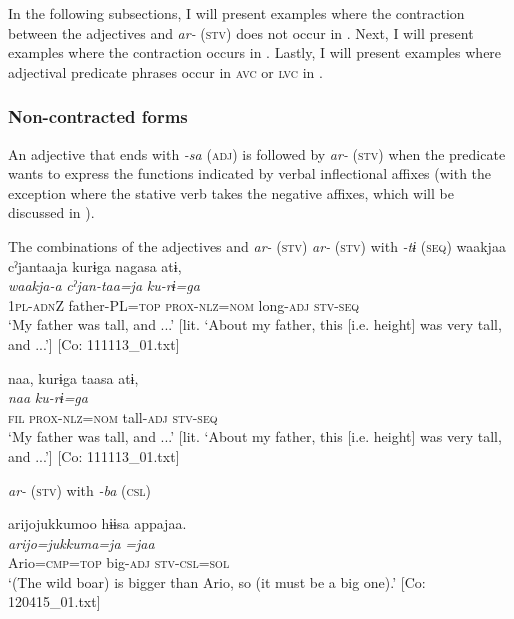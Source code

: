   In the following subsections, I will present examples where the contraction between the adjectives and \textit{ar-} (\textsc{stv}) does not occur in . Next, I will present examples where the contraction occurs in . Lastly, I will present examples where adjectival predicate phrases occur in \textsc{avc} or \textsc{lvc} in .

\subsubsection{Non-contracted forms}\label{sec:9.2.2.1}
\label{bkm:Ref361739107}
An adjective that ends with \textit{{}-sa} (\textsc{adj}) is followed by \textit{ar-} (\textsc{stv}) when the predicate wants to express the functions indicated by verbal inflectional affixes (with the exception where the stative verb takes the negative affixes, which will be discussed in ).

\ea   The combinations of the adjectives and \textit{ar-} (\textsc{stv}) \label{ex:9.45}
\exi{}  \textit{ar-} (\textsc{stv}) with \textit{{}-tɨ} (\textsc{seq})
\ea %
 \glll  waakjaa  cˀjantaaja  kurɨga  nagasa  atɨ,\\
      \textit{waakja-a}  \textit{cˀjan-taa=ja}  \textit{ku-rɨ=ga}  \textit{}  \textit{}\\
      1\textsc{pl}-\textsc{adn}Z  father-PL=\textsc{top}  \textsc{prox}-\textsc{nlz}=\textsc{nom}  long-\textsc{adj}  \textsc{stv}-\textsc{seq}\\
      \glt       ‘My father was tall, and ...’ [lit. ‘About my father, this [i.e. height] was very tall, and ...’] [Co: 111113\_01.txt]

\ex \label{ex:9.45b} %
    \glll  naa,  kurɨga  taasa  atɨ,\\
      \textit{naa}  \textit{ku-rɨ=ga}  \textit{}  \textit{}\\
      \textsc{fil}  \textsc{prox}-\textsc{nlz}=\textsc{nom}  tall-\textsc{adj}  \textsc{stv}-\textsc{seq}\\
      \glt       ‘My father was tall, and ...’ [lit. ‘About my father, this [i.e. height] was very tall, and ...’] [Co: 111113\_01.txt]

\exi{} \textit{ar-} (\textsc{stv}) with \textit{{}-ba} (\textsc{csl})

\ex \label{ex:9.45c} %
    \glll  arijojukkumoo  hɨɨsa  appajaa.\\
      \textit{arijo=jukkuma=ja}  \textit{}  \textit{=jaa}\\
      Ario=\textsc{cmp}=\textsc{top}  big-\textsc{adj}  \textsc{stv}-\textsc{csl}=\textsc{sol}\\
      \glt       ‘(The wild boar) is bigger than Ario, so (it must be a big one).’ [Co: 120415\_01.txt]

